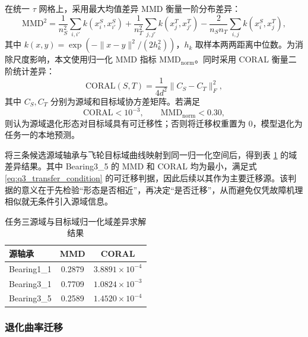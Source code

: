 在统一 $\tau$ 网格上，采用最大均值差异 MMD 衡量一阶分布差异：
\begin{equation}
  \label{eq:q3_mmd}
  \mathrm{MMD}^2
  =
  \frac{1}{n_S^2}\sum_{i,i'}k(x_i^S,x_{i'}^S)
  +
  \frac{1}{n_T^2}\sum_{j,j'}k(x_j^T,x_{j'}^T)
  -
  \frac{2}{n_Sn_T}\sum_{i,j}k(x_i^S,x_j^T),
\end{equation}
其中 $k(x,y)=\exp(-\|x-y\|^2/(2h_k^2))$，$h_k$ 取样本两两距离中位数。为消除尺度影响，本文使用归一化 MMD 指标 $\mathrm{MMD}_{\mathrm{norm}}$。同时采用 CORAL 衡量二阶统计差异：
\begin{equation}
  \label{eq:q3_coral}
  \mathrm{CORAL}(S,T)=\frac{1}{4d^2}\|C_S-C_T\|_F^2,
\end{equation}
其中 $C_S,C_T$ 分别为源域和目标域协方差矩阵。若满足
\begin{equation}
  \label{eq:q3_transfer_condition}
  \mathrm{CORAL}<10^{-3},
  \qquad
  \mathrm{MMD}_{\mathrm{norm}}<0.30,
\end{equation}
则认为源域退化形态对目标域具有可迁移性；否则将迁移权重置为 0，模型退化为任务一的本地预测。

将三条候选源域轴承与飞轮目标域曲线映射到同一归一化空间后，得到表 \ref{tab:q3_domain_solution} 的域差异结果。其中 Bearing3\_5 的 MMD 和 CORAL 均为最小，满足式 \eqref{eq:q3_transfer_condition} 的可迁移判据，因此后续以其作为主要迁移源。该判据的意义在于先检验“形态是否相近”，再决定“是否迁移”，从而避免仅凭故障机理相似就无条件引入源域信息。
\begin{table}[H]
  \centering
  \caption{任务三源域与目标域归一化域差异求解结果}
  \label{tab:q3_domain_solution}
  \begin{tabular}{lcc}
    \toprule
    源轴承 & MMD & CORAL \\
    \midrule
    Bearing1\_1 & 0.2879 & $3.8891\times10^{-4}$ \\
    Bearing3\_1 & 0.7709 & $1.0824\times10^{-3}$ \\
    Bearing3\_5 & 0.2589 & $1.4520\times10^{-4}$ \\
    \bottomrule
  \end{tabular}
\end{table}

\subsubsection{退化曲率迁移}

